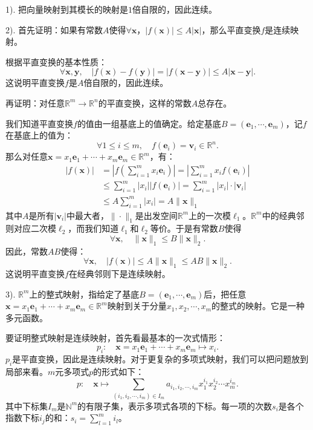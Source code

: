 \documentclass[12pt,UTF8]{ctexbook}
\begin{document}
\begin{so}
    1). 把向量映射到其模长的映射是$1$倍自限的，因此连续。

    2). 首先证明：如果有常数$A$使得$\forall \mathbf{x}$，$|f(\mathbf{x})|\leqslant A|\mathbf{x}|$，那么平直变换$f$是连续映射。

    根据平直变换的基本性质：
    $$ \forall \mathbf{x}, \mathbf{y}, \quad |f(\mathbf{x}) - f(\mathbf{y})| = |f(\mathbf{x} - \mathbf{y})| \leqslant A|\mathbf{x} - \mathbf{y}|.$$
    这说明平直变换$f$是$A$倍自限的，因此连续。

    再证明：对任意$\mathbb{R}^m \rightarrow \mathbb{R}^n$的平直变换，这样的常数$A$总存在。

    我们知道平直变换$f$的值由一组基底上的值确定。给定基底$B = (\mathbf{e}_1, \cdots, \mathbf{e}_m)$，记$f$在基底上的值为：
    $$ \forall 1\leqslant i\leqslant m, \quad f(\mathbf{e}_i) = \mathbf{v}_i\in\mathbb{R}^n.$$
    那么对任意$\mathbf{x} = x_1\mathbf{e}_1 + \cdots + x_m\mathbf{e}_m\in\mathbb{R}^m$，有：
    \begin{align*}
        |f(\mathbf{x})| &= \left|f\left(\sum_{i=1}^m x_i \mathbf{e}_i\right)\right| = \left|\sum_{i=1}^m x_i f\left(\mathbf{e}_i\right)\right| \\
        &\leqslant \sum_{i=1}^m |x_i| \left| f\left(\mathbf{e}_i\right)\right| = \sum_{i=1}^m |x_i|\cdot |\mathbf{v}_i| \\
        &\leqslant A \sum_{i=1}^m |x_i| = A\|\mathbf{x}\|_1
    \end{align*}
    其中$A$是所有$|\mathbf{v}_i|$中最大者，$\|\cdot\|_1$是出发空间$\mathbb{R}^m $上的一次模$\ell_1$。$\mathbb{R}^m $中的经典邻则对应二次模$\ell_2$，而我们知道$\ell_1$和$\ell_2$等价。于是有常数$B$使得
    $$ \forall \mathbf{x}, \quad \|\mathbf{x}\|_1 \leqslant B\|\mathbf{x}\|_2. $$
    因此，常数$AB$使得：
    $$ \forall \mathbf{x}, \quad |f(\mathbf{x})| \leqslant A\|\mathbf{x}\|_1 \leqslant AB\|\mathbf{x}\|_2. $$
    这说明平直变换$f$在经典邻则下是连续映射。

    3). $\mathbb{R}^m$上的整式映射，指给定了基底$B = (\mathbf{e}_1, \cdots, \mathbf{e}_m)$后，把任意$\mathbf{x} = x_1\mathbf{e}_1 + \cdots + x_m\mathbf{e}_m\in\mathbb{R}^m$映射到关于分量$x_1, x_2, \cdots, x_m$的整式的映射。它是一种多元函数。

    要证明整式映射是连续映射，首先看最基本的一次式情形：
    $$ p_i: \quad \mathbf{x} = x_1\mathbf{e}_1 + \cdots + x_m\mathbf{e}_m \mapsto x_i. $$
    $p_i$是平直变换，因此是连续映射。对于更复杂的多项式映射，我们可以把问题放到局部来看。$m$元多项式$p$的形式如下：
    $$ p: \quad \mathbf{x} \mapsto \sum_{(i_1,i_2,\cdots, i_m)\in I_m} a_{i_1, i_2, \cdots, i_m} x_1^{i_1} x_2^{i_2}\cdots x_m^{i_m}.$$
    其中下标集$I_m$是$\mathbb{N}^m$的有限子集，表示多项式各项的下标。每一项的次数$s_i$是各个指数下标$i_j$的和：$s_i = \sum_{l=1}^m i_l$。


\end{so}
\end{document}
